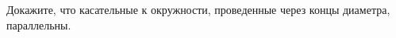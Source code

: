 \begin{ex}
	\begin{condition}
		Докажите, что касательные к окружности, проведенные через концы диаметра, параллельны.
	\end{condition}
\end{ex}